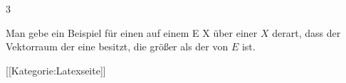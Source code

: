 {3}
{

Man gebe ein Beispiel für einen
auf einem
 { E } { X
} {}
über einer
$X$ derart, dass der Vektorraum
  der
eine
besitzt, die größer als der
von $E$ ist.

}
{} {}

 [[Kategorie:Latexseite]]
